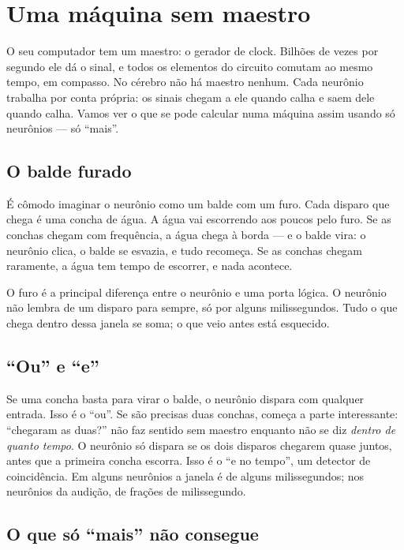 \chapter{Uma máquina sem maestro}

O seu computador tem um maestro: o gerador de clock. Bilhões de vezes por segundo ele dá o sinal, e todos os elementos do circuito comutam ao mesmo tempo, em compasso. No cérebro não há maestro nenhum. Cada neurônio trabalha por conta própria: os sinais chegam a ele quando calha e saem dele quando calha. Vamos ver o que se pode calcular numa máquina assim usando só neurônios  --- só ``mais''.

\section*{O balde furado}

É cômodo imaginar o neurônio como um balde com um furo. Cada disparo que chega é uma concha de água. A água vai escorrendo aos poucos pelo furo. Se as conchas chegam com frequência, a água chega à borda --- e o balde vira: o neurônio clica, o balde se esvazia, e tudo recomeça. Se as conchas chegam raramente, a água tem tempo de escorrer, e nada acontece.


O furo é a principal diferença entre o neurônio e uma porta lógica. O neurônio não lembra de um disparo para sempre, só por alguns milissegundos. Tudo o que chega dentro dessa janela se soma; o que veio antes está esquecido.

\section*{``Ou'' e ``e''}

Se uma concha basta para virar o balde, o neurônio dispara com qualquer entrada. Isso é o ``ou''. Se são precisas duas conchas, começa a parte interessante: ``chegaram as duas?'' não faz sentido sem maestro enquanto não se diz \emph{dentro de quanto tempo}. O neurônio só dispara se os dois disparos chegarem quase juntos, antes que a primeira concha escorra. Isso é o ``e no tempo'', um detector de coincidência. Em alguns neurônios a janela é de alguns milissegundos; nos neurônios da audição, de frações de milissegundo.

\section*{O que só ``mais'' não consegue}

